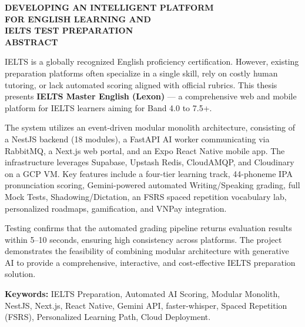 \newpage
{} 
\setcounter{page}{1}
\thispagestyle{plain} 

\begin{center}
    \textbf{\fontsize{16pt}{19pt}\selectfont DEVELOPING AN INTELLIGENT PLATFORM}\\
    \textbf{\fontsize{16pt}{19pt}\selectfont FOR ENGLISH LEARNING AND}\\
    \textbf{\fontsize{16pt}{19pt}\selectfont IELTS TEST PREPARATION}\\
    \vspace{0.8cm}
    \textbf{\fontsize{14pt}{16pt}\selectfont ABSTRACT}
\end{center}
\justify
\begin{sloppypar}
IELTS is a globally recognized English proficiency certification. However, existing preparation platforms often specialize in a single skill, rely on costly human tutoring, or lack automated scoring aligned with official rubrics. This thesis presents \textbf{IELTS Master English (Lexon)} — a comprehensive web and mobile platform for IELTS learners aiming for Band 4.0 to 7.5+.

The system utilizes an event-driven modular monolith architecture, consisting of a NestJS backend (18 modules), a FastAPI AI worker communicating via RabbitMQ, a Next.js web portal, and an Expo React Native mobile app. The infrastructure leverages Supabase, Upstash Redis, CloudAMQP, and Cloudinary on a GCP VM. Key features include a four-tier learning track, 44-phoneme IPA pronunciation scoring, Gemini-powered automated Writing/Speaking grading, full Mock Tests, Shadowing/Dictation, an FSRS spaced repetition vocabulary lab, personalized roadmaps, gamification, and VNPay integration.

Testing confirms that the automated grading pipeline returns evaluation results within 5–10 seconds, ensuring high consistency across platforms. The project demonstrates the feasibility of combining modular architecture with generative AI to provide a comprehensive, interactive, and cost-effective IELTS preparation solution.
\end{sloppypar}

\vspace{0.6cm}
{\sloppy \noindent \textbf{Keywords:} IELTS Preparation, Automated AI Scoring, Modular Monolith, NestJS, Next.js, React Native, Gemini API, faster-whisper, Spaced Repetition (FSRS), Personalized Learning Path, Cloud Deployment.\par}

